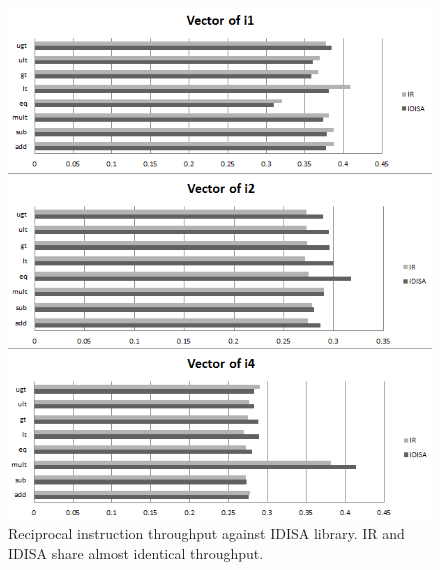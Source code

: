 \begin{figure}[ht!]
\centering
\includegraphics[width=140mm]{draw/reciprocal_throughput_vector.png}
\caption[Reciprocal Instruction Throughput Against IDISA Library]{Reciprocal instruction throughput against IDISA library. IR and IDISA share almost identical throughput.}
\label{figure:throughput_vector}
\end{figure}

